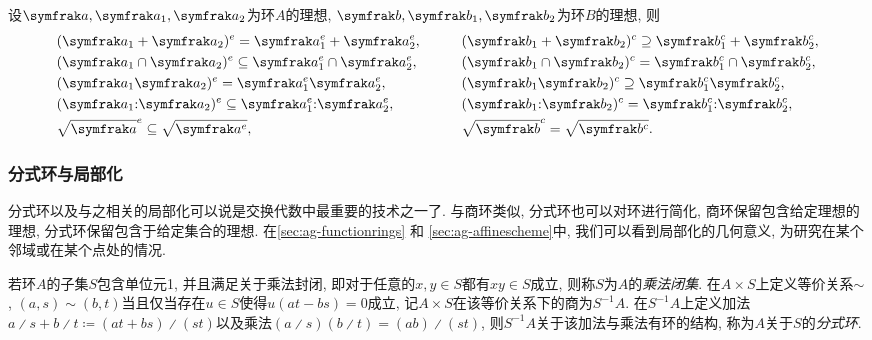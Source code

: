 \begin{proposition}\label{prop:extencontrop}
  设$\ideal{a}, \ideal{a}_1, \ideal{a}_2$为环$A$的理想, $\ideal{b}, \ideal{b}_1, \ideal{b}_2$为环$B$的理想, 则
  \begin{equation*}
    \begin{aligned}
      &(\ideal{a}_1+\ideal{a}_2)^e=\ideal{a}_1^e+\ideal{a}_2^e,
      &&\qquad(\ideal{b}_1+\ideal{b_2})^c\supseteq \ideal{b}_1^c+\ideal{b}_2^c,\\
      &(\ideal{a}_1\cap\ideal{a}_2)^e\subseteq\ideal{a}_1^e\cap\ideal{a}_2^e,
      &&\qquad(\ideal{b}_1\cap\ideal{b_2})^c= \ideal{b}_1^c\cap\ideal{b}_2^c,\\
      &(\ideal{a}_1\ideal{a}_2)^e=\ideal{a}_1^e\ideal{a}_2^e,
      &&\qquad(\ideal{b}_1\ideal{b_2})^c\supseteq\ideal{b}_1^c\ideal{b}_2^c,\\
      &(\ideal{a}_1{:}\ideal{a}_2)^e\subseteq\ideal{a}_1^e{:}\ideal{a}_2^e,
      &&\qquad(\ideal{b}_1{:}\ideal{b_2})^c= \ideal{b}_1^c{:}\ideal{b}_2^c,\\
      &\sqrt{\ideal{a}}^e\subseteq\sqrt{\ideal{a}^e},
      &&\qquad\sqrt{\ideal{b}}^c= \sqrt{\ideal{b}^c}.
    \end{aligned}
  \end{equation*}
\end{proposition}

\subsubsection{分式环与局部化}\label{sec:algebra-localization}

分式环以及与之相关的局部化可以说是交换代数中最重要的技术之一了. 与商环类似, 分式环也可以对环进行简化, 商环保留包含给定理想的理想, 分式环保留包含于给定集合的理想. 在\ref{sec:ag-functionrings} 和 \ref{sec:ag-affinescheme}中, 我们可以看到局部化的几何意义, 为研究在某个邻域或在某个点处的情况.

\begin{definition}
  若环$A$的子集$S$包含单位元1, 并且满足关于乘法封闭, 即对于任意的$x, y\in S$都有$xy\in S$成立, 则称$S$为$A$的\emph{乘法闭集}. 在$A\times S$上定义等价关系${\sim}$, $(a, s)\sim (b, t)$当且仅当存在$u\in S$使得$u(at-bs)=0$成立, 记$A\times S$在该等价关系下的商为$S^{-1}A$. 在$S^{-1}A$上定义加法$a{\divslash} s+b{\divslash}t \coloneq  (at+bs){\divslash}(st)$以及乘法$(a{\divslash}s)(b{\divslash}t)=(ab){\divslash}(st)$, 则$S^{-1}A$关于该加法与乘法有环的结构, 称为$A$关于$S$的\emph{分式环}.
\end{definition}

